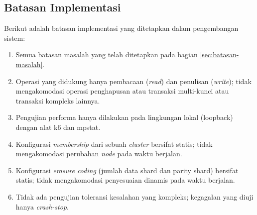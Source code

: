 \subsection{Batasan Implementasi}
\label{subsection:batasan-implementasi}

Berikut adalah batasan implementasi yang ditetapkan dalam pengembangan sistem:
\begin{enumerate}
  \item Semua batasan masalah yang telah ditetapkan pada bagian \ref{sec:batasan-masalah}.
  \item Operasi yang didukung hanya pembacaan (\textit{read}) dan penulisan (\textit{write}); tidak mengakomodasi operasi penghapusan atau transaksi multi-kunci atau transaksi kompleks lainnya.
  \item Pengujian performa hanya dilakukan pada lingkungan lokal (loopback) dengan alat k6 dan mpstat.
  \item Konfigurasi \textit{membership} dari sebuah \textit{cluster} bersifat statis; tidak mengakomodasi perubahan \textit{node} pada waktu berjalan.
  \item Konfigurasi \textit{erasure coding} (jumlah data shard dan parity shard) bersifat statis; tidak mengakomodasi penyesuaian dinamis pada waktu berjalan.
  \item Tidak ada pengujian toleransi kesalahan yang kompleks; kegagalan yang diuji hanya \textit{crash-stop}.
\end{enumerate}


